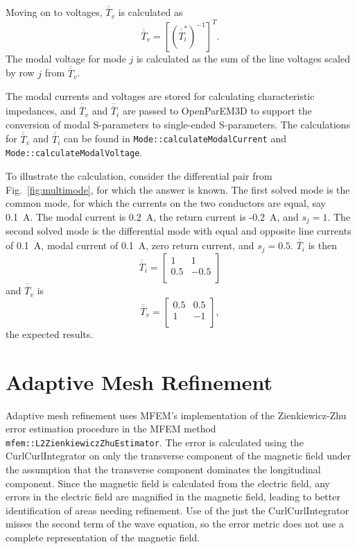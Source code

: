 \documentclass[titlepage]{article}
\renewcommand\_{\textunderscore\linebreak[1]}
\begin{document}
Moving on to voltages, $\overline{\overline{T}}_v$ is calculated as
\begin{equation}
\overline{\overline{T}}_v=[(\overline{\overline{T}}_i^*)^{-1}]^T.
\end{equation}
The modal voltage for mode $j$ is calculated as the sum of the line voltages scaled by row $j$ from $\overline{\overline{T}}_v$.

The modal currents and voltages are stored for calculating characteristic impedances, and $\overline{\overline{T}}_v$ and $\overline{\overline{T}}_i$ are passed to OpenParEM3D to support the conversion of modal S-parameters to single-ended S-parameters.  The calculations for $\overline{\overline{T}}_v$ and $\overline{\overline{T}}_i$ can be found in \texttt{Mode::calculateModalCurrent} and \newline\texttt{Mode::calculateModalVoltage}.

To illustrate the calculation, consider the differential pair from Fig.~\ref{fig:multimode}, for which the answer is known. The first solved mode is the common mode, for which the currents on the two conductors are equal, say 0.1~A.  The modal current is 0.2~A, the return current is -0.2~A, and $s_j=1$.  The second solved mode is the differential mode with equal and opposite line currents of 0.1~A, modal current of 0.1~A, zero return current, and $s_j=0.5$.  $\overline{\overline{T}}_i$ is then
\begin{equation}
\overline{\overline{T}}_i=\left[ \begin{array}{cc}
  1 & 1\\
  0.5 & -0.5 \\
\end{array}\right]
\end{equation}
and $\overline{\overline{T}}_v$ is
\begin{equation}
\overline{\overline{T}}_v=\left[ \begin{array}{cc}
  0.5 & 0.5 \\
  1   & -1  \\
\end{array}\right],
\end{equation}
the expected results.

\section{Adaptive Mesh Refinement}

Adaptive mesh refinement uses MFEM's implementation of the Zienkiewicz-Zhu error estimation procedure in the MFEM method \texttt{mfem::L2ZienkiewiczZhuEstimator}.  The error is calculated using the CurlCurlIntegrator on only the transverse component of the magnetic field under the assumption that the transverse component dominates the longitudinal component.  Since the magnetic field is calculated from the electric field, any errors in the electric field are magnified in the magnetic field, leading to better identification of areas needing refinement.  Use of the just the CurlCurlIntegrator misses the second term of the wave equation, so the error metric does not use a complete representation of the magnetic field.
\end{document}
